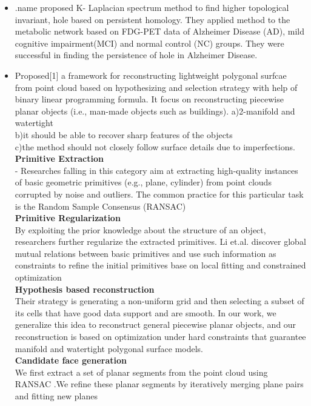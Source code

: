 \documentclass[12pt]{article}
\begin{document}
\begin{itemize}
\item .name proposed K- Laplacian spectrum method to find higher topological invariant, hole based on persistent homology. They applied method to the metabolic network based on FDG-PET data of Alzheimer Disease (AD), mild cognitive impairment(MCI) and normal control (NC) groups. They were successful in finding the persistence of hole in Alzheimer Disease.
\item Proposed[1] a framework for reconstructing lightweight polygonal surfcae from point cloud based on  hypothesizing and selection strategy with help of binary linear programming formula. 
It focus on reconstructing piecewise planar objects (i.e., man-made objects such as buildings).
a)2-manifold and watertight\\
b)it should be able to recover sharp features of the objects\\
c)the method should not closely follow surface details due to imperfections.\\
{\textbf{Primitive Extraction}}\\- Researches falling in this category aim at extracting high-quality instances of basic geometric primitives (e.g., plane, cylinder) from point clouds corrupted by noise and outliers. The common practice for this particular task is the Random Sample Consensus (RANSAC)\\
{\textbf{Primitive Regularization}}\\ By exploiting the prior knowledge about the structure of an object, researchers further regularize the extracted primitives. Li et.al. discover global mutual relations between basic primitives and use such information as constraints to refine the initial primitives base on local fitting and constrained optimization\\
{\textbf{Hypothesis based reconstruction}}\\ Their strategy is generating a non-uniform grid and then selecting a subset of its cells that have good data support and are smooth. In our work, we generalize this idea to reconstruct general piecewise planar objects, and our reconstruction is based on optimization under hard constraints that guarantee manifold and watertight polygonal surface models.\\
{\textbf{Candidate face generation}}\\ We first extract a set of planar segments from the point cloud using RANSAC .We refine these planar segments by iteratively merging plane pairs and fitting new planes\\

\end{itemize}
\end{document}
